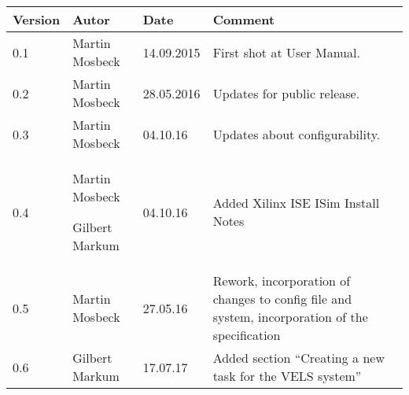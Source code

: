 
\begin{table}[h]
\begin{tabular*}{14.7cm}{|p{}|p{}|p{2cm}|p{}|}
\hline 
Version & Autor & Date & Comment \\[2pt]
\hline
\hline
0.1 & Martin Mosbeck & 14.09.2015 & First shot at User Manual. \\[2pt]
\hline 
0.2 & Martin Mosbeck & 28.05.2016 & Updates for public release. \\[2pt]
\hline 
0.3 & Martin Mosbeck & 04.10.16 & Updates about configurability. \\[2pt]
\hline 
0.4 & Martin Mosbeck \par Gilbert Markum & 04.10.16 & Added Xilinx ISE ISim Install Notes \\[2pt]
\hline 
0.5 & Martin Mosbeck & 27.05.16 & Rework, incorporation of changes to config file and system, incorporation of the 
specification \\[2pt]
\hline
0.6 & Gilbert Markum & 17.07.17 & Added section ``Creating a new task for the VELS system'' \\[2pt]
\hline
\end{tabular*}
\end{table}

